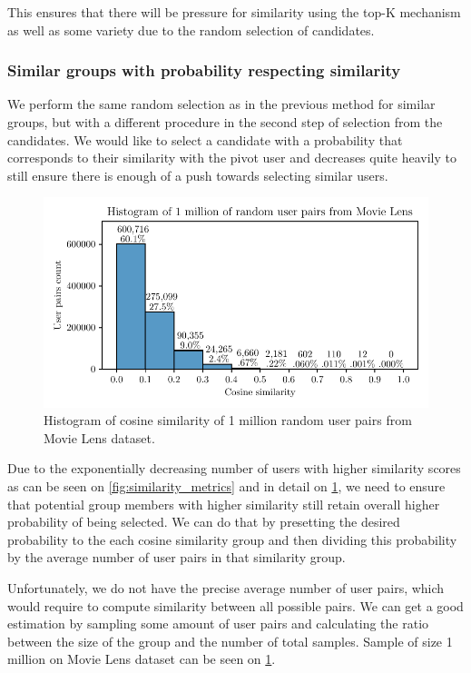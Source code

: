 This ensures that there will be pressure for similarity using the top-K mechanism as well as some variety due to the random selection of candidates.

\subsubsection{Similar groups with probability respecting similarity}
We perform the same random selection as in the previous method for similar groups, but with a different procedure in the second step of selection from the candidates. We would like to select a candidate with a probability that corresponds to their similarity with the pivot user and decreases quite heavily to still ensure there is enough of a push towards selecting similar users.

\begin{figure}[ht!]
    \centering
    \includegraphics{img/figures/histogram_cosine.pdf}
    \caption{Histogram of cosine similarity of 1 million random user pairs from Movie Lens dataset.}
    \label{fig:cosine_movielens_histogram}
\end{figure}

Due to the exponentially decreasing number of users with higher similarity scores as can be seen on \ref{fig:similarity_metrics} and in detail on \ref{fig:cosine_movielens_histogram}, we need to ensure that potential group members with higher similarity still retain overall higher probability of being selected. We can do that by presetting the desired probability to the each cosine similarity group and then dividing this probability by the average number of user pairs in that similarity group.

Unfortunately, we do not have the precise average number of user pairs, which would require to compute similarity between all possible pairs. We can get a good estimation by sampling some amount of user pairs and calculating the ratio between the size of the group and the number of total samples. Sample of size 1 million on Movie Lens dataset can be seen on \ref{fig:cosine_movielens_histogram}.


